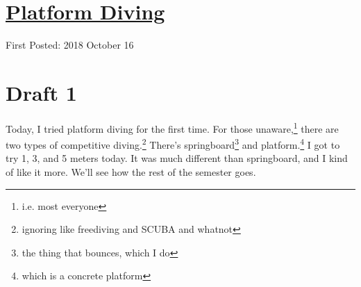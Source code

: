 \documentclass[12pt]{article}[titlepage]
\newcommand{\1}{\={a}}
\newcommand{\2}{\={e}}
\newcommand{\3}{\={\i}}
\newcommand{\4}{\=o}
\newcommand{\5}{\=u}
\newcommand{\6}{\={A}}
\renewcommand{\,}{\textsuperscript{,}}
\begin{document}
\doublespacing
\section{\href{platform-diving.html}{Platform Diving}}
First Posted: 2018 October 16
\section{Draft 1}
Today, I tried platform diving for the first time.
For those unaware,\footnote{i.e. most everyone} there are two types of competitive diving.\footnote{ignoring like freediving and SCUBA and whatnot}
There's springboard\footnote{the thing that bounces, which I do} and platform.\footnote{which is a concrete platform}
I got to try 1, 3, and 5 meters today.
It was much different than springboard, and I kind of like it more.
We'll see how the rest of the semester goes.
\end{document}
